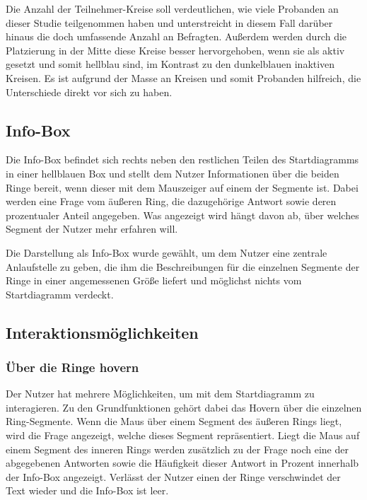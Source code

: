 \documentclass{mi-seminar}
\begin{document}
Die Anzahl der Teilnehmer-Kreise soll verdeutlichen, wie viele Probanden an dieser Studie teilgenommen haben und unterstreicht in diesem Fall darüber hinaus die doch umfassende Anzahl an Befragten. Außerdem werden durch die Platzierung in der Mitte diese Kreise besser hervorgehoben, wenn sie als aktiv gesetzt und somit hellblau sind, im Kontrast zu den dunkelblauen inaktiven Kreisen. Es ist aufgrund der Masse an Kreisen und somit Probanden hilfreich, die Unterschiede direkt vor sich zu haben. 

\subsection{Info-Box}
Die Info-Box befindet sich rechts neben den restlichen Teilen des Startdiagramms in einer hellblauen Box und stellt dem Nutzer Informationen über die beiden Ringe bereit, wenn dieser mit dem Mauszeiger auf einem der Segmente ist. Dabei werden eine Frage vom äußeren Ring, die dazugehörige Antwort sowie deren prozentualer Anteil angegeben. Was angezeigt wird hängt davon ab, über welches Segment der Nutzer mehr erfahren will. 

Die Darstellung als Info-Box wurde gewählt, um dem Nutzer eine zentrale Anlaufstelle zu geben, die ihm die Beschreibungen für die einzelnen Segmente der Ringe in einer angemessenen Größe liefert und möglichst nichts vom Startdiagramm verdeckt. 

\subsection{Interaktionsmöglichkeiten}
\subsubsection{Über die Ringe hovern}
Der Nutzer hat mehrere Möglichkeiten, um mit dem Startdiagramm zu interagieren. Zu den Grundfunktionen gehört dabei das Hovern über die einzelnen Ring-Segmente. Wenn die Maus über einem Segment des äußeren Rings liegt, wird die Frage angezeigt, welche dieses Segment repräsentiert. Liegt die Maus auf einem Segment des inneren Rings werden zusätzlich zu der Frage noch eine der abgegebenen Antworten sowie die Häufigkeit dieser Antwort in Prozent innerhalb der Info-Box angezeigt. Verlässt der Nutzer einen der Ringe verschwindet der Text wieder und die Info-Box ist leer. 
\end{document}
